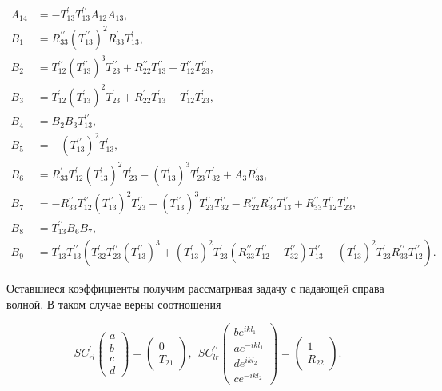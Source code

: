 \documentclass[a4 paper, 12 pt]{extarticle}
\begin{document}
\[\begin{aligned}
   A_{14} &= -T_{13}^\prime T_{13}^{\prime\prime} A_{12} A_{13}, \\
   B_1 &= R_{33}^{\prime\prime} (T_{13}^{\prime\prime})^2 R_{33}^\prime T_{13}^\prime, \\
   B_2 &= T_{12}^{\prime\prime} (T_{13}^{\prime\prime})^3 T_{23}^{\prime\prime} + R_{22}^{\prime\prime} T_{13}^{\prime\prime} - T_{12}^{\prime\prime} T_{23}^{\prime\prime}, \\
   B_3 &= T_{12}^\prime (T_{13}^\prime)^2 T_{23}^\prime + R_{22}^\prime T_{13}^\prime - T_{12}^\prime T_{23}^\prime, \\
   B_4 &= B_2 B_3 T_{13}^{\prime\prime}, \\
   B_5 &= -(T_{13}^{\prime\prime})^2 T_{13}^\prime, \\
   B_6 &= R_{33}^\prime T_{12}^\prime (T_{13}^\prime)^2 T_{23}^\prime - (T_{13}^\prime)^3 T_{23}^\prime T_{32}^\prime + A_3 R_{33}^\prime, \\
   B_7 &= -R_{33}^{\prime\prime} T_{12}^{\prime\prime} (T_{13}^{\prime\prime})^2 T_{23}^{\prime\prime} + (T_{13}^{\prime\prime})^3 T_{23}^{\prime\prime} T_{32}^{\prime\prime} - R_{22}^{\prime\prime} R_{33}^{\prime\prime} T_{13}^{\prime\prime} + R_{33}^{\prime\prime} T_{12}^{\prime\prime} T_{23}^{\prime\prime}, \\
   B_8 &= T_{13}^{\prime\prime} B_6 B_7, \\
   B_9 &= T_{13}^\prime T_{13}^{\prime\prime} \left(T_{32}^\prime T_{23}^{\prime\prime} (T_{13}^{\prime\prime})^3 + (T_{13}^\prime)^2 T_{23}^\prime \left(R_{33}^{\prime\prime} T_{12}^{\prime\prime} + T_{32}^{\prime\prime}\right)T_{13}^{\prime\prime} - (T_{13}^\prime)^2 T_{23}^\prime R_{33}^{\prime\prime} T_{12}^{\prime\prime}\right).
   \end{aligned}\]
   
   Оставшиеся коэффициенты получим рассматривая задачу с падающей справа волной. В таком случае верны соотношения
   
   \[
   SC_{rl}^\prime\left(
   \begin{array}{c}
   a \\
   b \\
   c \\
   d
   \end{array}\right) = \left(\begin{array}{c}
   0 \\
   T_{21}
   \end{array}\right), \ \ 
   SC_{lr}^{\prime\prime}\left(
   \begin{array}{c}
   b e^{ikl_1} \\
   a e^{-ikl_1}\\
   d e^{ikl_2}\\
   c e^{-ikl_2}
   \end{array}\right) = \left(\begin{array}{c}
   1 \\
   R_{22}
   \end{array}\right).   
   \]
   
\end{document}

